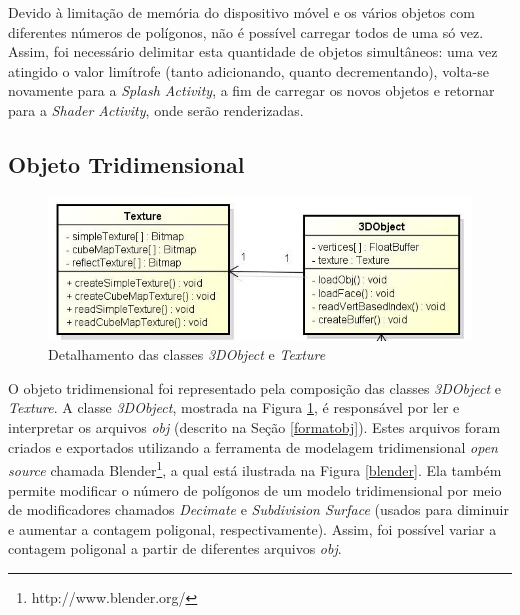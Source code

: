 	Devido à limitação de memória do dispositivo móvel e os vários objetos com diferentes números de polígonos, não é possível carregar todos de uma só vez. Assim, foi necessário delimitar esta quantidade de objetos simultâneos: uma vez atingido o valor limítrofe (tanto adicionando, quanto decrementando), volta-se novamente para a \textit{Splash Activity}, a fim de carregar os novos objetos e retornar para a \textit{Shader Activity}, onde serão renderizadas.

\subsection{Objeto Tridimensional}   

	\begin{figure}[ht]
	\centering
		\includegraphics[keepaspectratio=true,scale=0.6]{figuras/object_texture.jpg}
	\caption{Detalhamento das classes \textit{3DObject} e \textit{Texture}}
	\label{object_texture}
	\end{figure}

	O objeto tridimensional foi representado pela composição das classes \textit{3DObject} e \textit{Texture}. A classe \textit{3DObject}, mostrada na Figura \ref{object_texture}, é responsável por ler e interpretar os arquivos  \textit{obj}  (descrito na Seção \ref{formatobj}). Estes arquivos foram criados e exportados utilizando a ferramenta de modelagem tridimensional \textit{open source} chamada Blender\footnote{http://www.blender.org/}, a qual está ilustrada na Figura \ref{blender}. Ela também permite modificar o número de polígonos de um modelo tridimensional por meio de modificadores chamados \textit{Decimate} e \textit{Subdivision Surface} (usados para diminuir e aumentar a contagem poligonal, respectivamente).  Assim, foi possível variar a contagem poligonal a partir de diferentes arquivos \textit{obj}.

